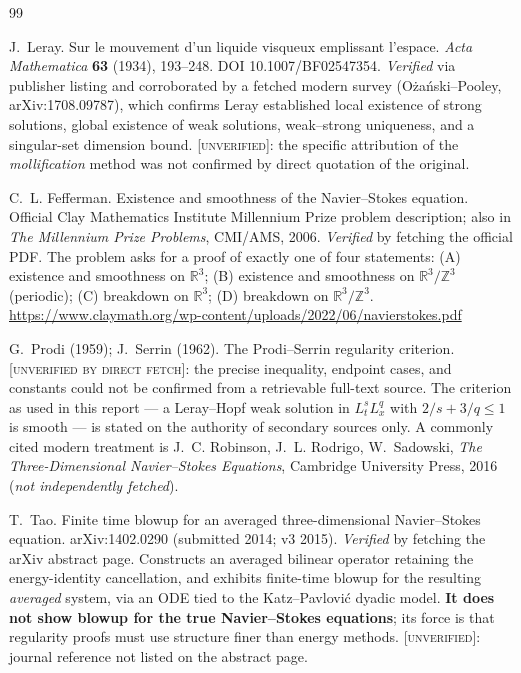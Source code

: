 \documentclass[11pt,a4paper]{article}
\newcommand{\Z}{\mathbb{Z}}
\newcommand{\R}{\mathbb{R}}
\theoremstyle{definition}
\theoremstyle{plain}
\begin{document}
\begin{thebibliography}{99}

J.~Leray.
\newblock Sur le mouvement d'un liquide visqueux emplissant l'espace.
\newblock \emph{Acta Mathematica} \textbf{63} (1934), 193--248. DOI 10.1007/BF02547354.
\newblock \emph{Verified} via publisher listing and corroborated by a fetched modern survey
(Oża\'nski--Pooley, arXiv:1708.09787), which confirms Leray established local existence of
strong solutions, global existence of weak solutions, weak--strong uniqueness, and a
singular-set dimension bound. \textsc{[unverified]}: the specific attribution of the
\emph{mollification} method was not confirmed by direct quotation of the original.

C.~L. Fefferman.
\newblock Existence and smoothness of the Navier--Stokes equation.
\newblock Official Clay Mathematics Institute Millennium Prize problem description; also in
\emph{The Millennium Prize Problems}, CMI/AMS, 2006.
\newblock \emph{Verified} by fetching the official PDF. The problem asks for a proof of
exactly one of four statements: (A) existence and smoothness on $\R^3$; (B) existence and
smoothness on $\R^3/\Z^3$ (periodic); (C) breakdown on $\R^3$; (D) breakdown on $\R^3/\Z^3$.
\newblock \url{https://www.claymath.org/wp-content/uploads/2022/06/navierstokes.pdf}

G.~Prodi (1959); J.~Serrin (1962).
\newblock The Prodi--Serrin regularity criterion.
\newblock \textsc{[unverified by direct fetch]}: the precise inequality, endpoint cases, and
constants could not be confirmed from a retrievable full-text source. The criterion as used
in this report --- a Leray--Hopf weak solution in $L^s_tL^q_x$ with $2/s+3/q\le1$ is smooth
--- is stated on the authority of secondary sources only. A commonly cited modern treatment
is J.~C. Robinson, J.~L. Rodrigo, W.~Sadowski, \emph{The Three-Dimensional Navier--Stokes
Equations}, Cambridge University Press, 2016 (\emph{not independently fetched}).

T.~Tao.
\newblock Finite time blowup for an averaged three-dimensional Navier--Stokes equation.
\newblock arXiv:1402.0290 (submitted 2014; v3 2015).
\newblock \emph{Verified} by fetching the arXiv abstract page. Constructs an averaged
bilinear operator retaining the energy-identity cancellation, and exhibits finite-time
blowup for the resulting \emph{averaged} system, via an ODE tied to the Katz--Pavlovi\'c
dyadic model. \textbf{It does not show blowup for the true Navier--Stokes equations};
its force is that regularity proofs must use structure finer than energy methods.
\textsc{[unverified]}: journal reference not listed on the abstract page.


\end{thebibliography}
\end{document}
